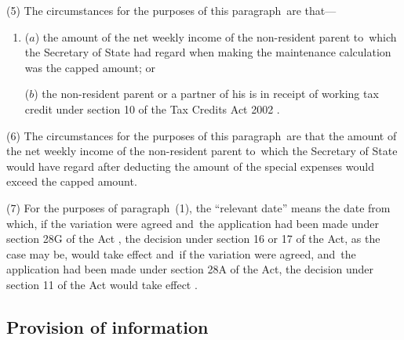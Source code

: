 \documentclass[12pt,a4paper]{article}
\begin{document}
(5) The circumstances for the purposes of this paragraph~are that—
\begin{enumerate}\item[]
($a$) the amount of the net weekly income of the non-resident parent to~which the Secretary of State had regard when making the maintenance calculation was the capped amount; or

($b$) the non-resident parent or a partner of his is in receipt of 
working tax credit under section 10 of the Tax Credits Act 2002%
.
\end{enumerate}

(6) The circumstances for the purposes of this paragraph~are that the amount of the net weekly income of the non-resident parent to~which the Secretary of State would have regard after deducting the amount of the special expenses would exceed the capped amount.

(7) For the purposes of paragraph~(1), the “relevant date” means the date from which, if the variation were agreed
and~the application had been made under section 28G of the Act%
, the decision under section 16 or 17 of the Act, as the case may be, would take effect
and~if the variation were agreed, and~the application had been made under section 28A of the Act, the decision under section 11 of the Act would take effect%
.


\subsection[8. Provision of information]{Provision of information}
\end{document}
